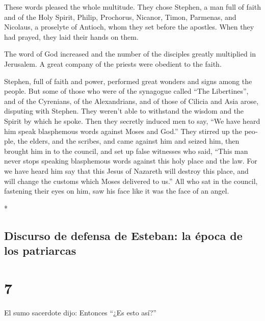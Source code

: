 \begin{paracol}{2}
\begin{otherlanguage}{english}
 These words pleased the whole multitude. They chose
Stephen, a man full of faith and of the Holy Spirit, Philip, Prochorus,
Nicanor, Timon, Parmenas, and Nicolaus, a proselyte of Antioch,
 whom they set before the apostles. When they had prayed,
they laid their hands on them.

 The word of God increased and the number of the disciples
greatly multiplied in Jerusalem. A great company of the priests were
obedient to the faith.

 Stephen, full of faith and power, performed great wonders
and signs among the people.  But some of those who were of
the synagogue called ``The Libertines'', and of the Cyrenians, of the
Alexandrians, and of those of Cilicia and Asia arose, disputing with
Stephen.  They weren't able to withstand the wisdom and
the Spirit by which he spoke.  Then they secretly induced
men to say, ``We have heard him speak blasphemous words against Moses
and God.''  They stirred up the people, the elders, and
the scribes, and came against him and seized him, then brought him in to
the council,  and set up false witnesses who said, ``This
man never stops speaking blasphemous words against this holy place and
the law.  For we have heard him say that this Jesus of
Nazareth will destroy this place, and will change the customs which
Moses delivered to us.''  All who sat in the council,
fastening their eyes on him, saw his face like it was the face of an
angel.

\end{otherlanguage}

\switchcolumn[0]*

\hypertarget{discurso-de-defensa-de-esteban-la-uxe9poca-de-los-patriarcas}{%
\subsection{Discurso de defensa de Esteban: la época de los
patriarcas}\label{discurso-de-defensa-de-esteban-la-uxe9poca-de-los-patriarcas}}

\hypertarget{section-12}{%
\section{7}\label{section-12}}

 El sumo sacerdote dijo: Entonces ``¿Es esto así?''


\end{paracol}
